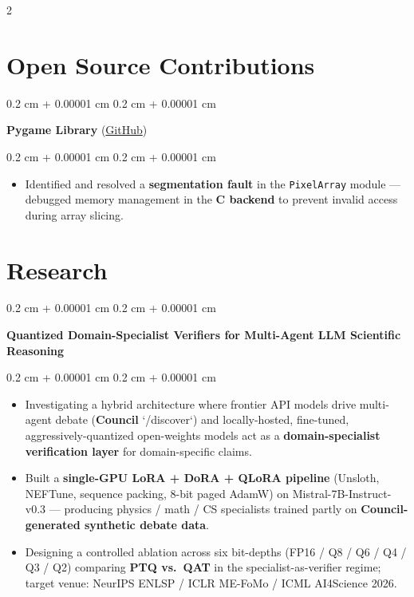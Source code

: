 \documentclass[10pt, letterpaper]{article}
\newenvironment{highlights}{
    \begin{itemize}[
        topsep=0.03 cm,
        parsep=0.03 cm,
        partopsep=0pt,
        itemsep=0pt,
        leftmargin=0.4 cm + 10pt
    ]
}{
    \end{itemize}
} %
\newenvironment{onecolentry}{
    \begin{adjustwidth}{
        0.2 cm + 0.00001 cm
    }{
        0.2 cm + 0.00001 cm
    }
}{
    \end{adjustwidth}
} %
\newenvironment{twocolentry}[2][]{
    \onecolentry
    \def\secondColumn{#2}
}{
    \hfill \secondColumn
    \endonecolentry
} %
\let\hrefWithoutArrow\href
\renewcommand{\href}[2]{\hrefWithoutArrow{#1}{\ifthenelse{\equal{#2}{}}{ }{#2 }\raisebox{.15ex}{\footnotesize \faExternalLink*}}}
\begin{document}
\begin{paracol}{2}
    \section{Open Source Contributions}

        \begin{onecolentry}
            \textbf{Pygame Library} (\hrefWithoutArrow{https://github.com/pygame/pygame}{GitHub})
        \end{onecolentry}
        \vspace{0.05 cm}
        \begin{onecolentry}
            \begin{highlights}
                \item Identified and resolved a \textbf{segmentation fault} in the \texttt{PixelArray} module — debugged memory management in the \textbf{C backend} to prevent invalid access during array slicing.
            \end{highlights}
        \end{onecolentry}


   \section{Research}

        \begin{twocolentry}{
        \href{https://github.com/razeenwasif/Council}{Github}
        }
            \textbf{Quantized Domain-Specialist Verifiers for Multi-Agent LLM Scientific Reasoning}
        \end{twocolentry}

        \vspace{0.05 cm}
        \begin{onecolentry}
            \begin{highlights}
                \item Investigating a hybrid architecture where frontier API models drive multi-agent debate (\textbf{Council} `/discover`) and locally-hosted, fine-tuned, aggressively-quantized open-weights models act as a \textbf{domain-specialist verification layer} for domain-specific claims.
                \item Built a \textbf{single-GPU LoRA + DoRA + QLoRA pipeline} (Unsloth, NEFTune, sequence packing, 8-bit paged AdamW) on Mistral-7B-Instruct-v0.3 — producing physics / math / CS specialists trained partly on \textbf{Council-generated synthetic debate data}.
                \item Designing a controlled ablation across six bit-depths (FP16 / Q8 / Q6 / Q4 / Q3 / Q2) comparing \textbf{PTQ vs.~QAT} in the specialist-as-verifier regime; target venue: NeurIPS ENLSP / ICLR ME-FoMo / ICML AI4Science 2026.
            \end{highlights}
        \end{onecolentry}


\end{paracol}
\end{document}
